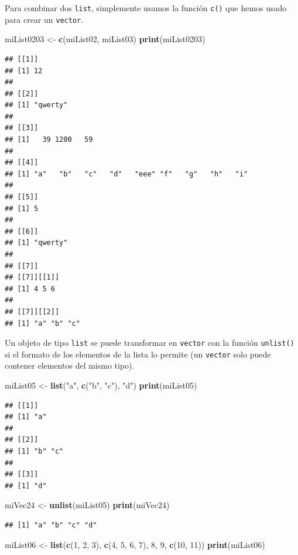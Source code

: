\documentclass[
]{book}
\newenvironment{Shaded}{\begin{snugshade}}{\end{snugshade}}
\newcommand{\DecValTok}[1]{\textcolor[rgb]{0.00,0.00,0.81}{#1}}
\newcommand{\KeywordTok}[1]{\textcolor[rgb]{0.13,0.29,0.53}{\textbf{#1}}}
\newcommand{\NormalTok}[1]{#1}
\newcommand{\StringTok}[1]{\textcolor[rgb]{0.31,0.60,0.02}{#1}}
\begin{document}
Para combinar dos \texttt{list}, simplemente usamos la función \texttt{c()} que hemos usado para crear un \texttt{vector}.

\begin{Shaded}
\begin{Highlighting}[]
\NormalTok{miList0203 <-}\StringTok{ }\KeywordTok{c}\NormalTok{(miList02, miList03)}
\KeywordTok{print}\NormalTok{(miList0203)}
\end{Highlighting}
\end{Shaded}

\begin{verbatim}
## [[1]]
## [1] 12
## 
## [[2]]
## [1] "qwerty"
## 
## [[3]]
## [1]   39 1200   59
## 
## [[4]]
## [1] "a"   "b"   "c"   "d"   "eee" "f"   "g"   "h"   "i"  
## 
## [[5]]
## [1] 5
## 
## [[6]]
## [1] "qwerty"
## 
## [[7]]
## [[7]][[1]]
## [1] 4 5 6
## 
## [[7]][[2]]
## [1] "a" "b" "c"
\end{verbatim}

Un objeto de tipo \texttt{list} se puede transformar en \texttt{vector} con la función \texttt{unlist()} si el formato de los elementos de la lista lo permite (un \texttt{vector} solo puede contener elementos del mismo tipo).

\begin{Shaded}
\begin{Highlighting}[]
\NormalTok{miList05 <-}\StringTok{ }\KeywordTok{list}\NormalTok{(}\StringTok{"a"}\NormalTok{, }\KeywordTok{c}\NormalTok{(}\StringTok{"b"}\NormalTok{, }\StringTok{"c"}\NormalTok{), }\StringTok{"d"}\NormalTok{)}
\KeywordTok{print}\NormalTok{(miList05)}
\end{Highlighting}
\end{Shaded}

\begin{verbatim}
## [[1]]
## [1] "a"
## 
## [[2]]
## [1] "b" "c"
## 
## [[3]]
## [1] "d"
\end{verbatim}

\begin{Shaded}
\begin{Highlighting}[]
\NormalTok{miVec24 <-}\StringTok{ }\KeywordTok{unlist}\NormalTok{(miList05)}
\KeywordTok{print}\NormalTok{(miVec24)}
\end{Highlighting}
\end{Shaded}

\begin{verbatim}
## [1] "a" "b" "c" "d"
\end{verbatim}

\begin{Shaded}
\begin{Highlighting}[]
\NormalTok{miList06 <-}\StringTok{ }\KeywordTok{list}\NormalTok{(}\KeywordTok{c}\NormalTok{(}\DecValTok{1}\NormalTok{, }\DecValTok{2}\NormalTok{, }\DecValTok{3}\NormalTok{), }\KeywordTok{c}\NormalTok{(}\DecValTok{4}\NormalTok{, }\DecValTok{5}\NormalTok{, }\DecValTok{6}\NormalTok{, }\DecValTok{7}\NormalTok{), }\DecValTok{8}\NormalTok{, }\DecValTok{9}\NormalTok{, }\KeywordTok{c}\NormalTok{(}\DecValTok{10}\NormalTok{, }\DecValTok{11}\NormalTok{))}
\KeywordTok{print}\NormalTok{(miList06)}
\end{Highlighting}
\end{Shaded}
\end{document}
